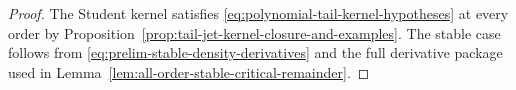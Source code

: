 \begin{proof}
The Student kernel satisfies \eqref{eq:polynomial-tail-kernel-hypotheses}
at every order by
Proposition~\ref{prop:tail-jet-kernel-closure-and-examples}.  The stable
case follows from \eqref{eq:prelim-stable-density-derivatives} and the full
derivative package used in
Lemma~\ref{lem:all-order-stable-critical-remainder}.
\end{proof}
